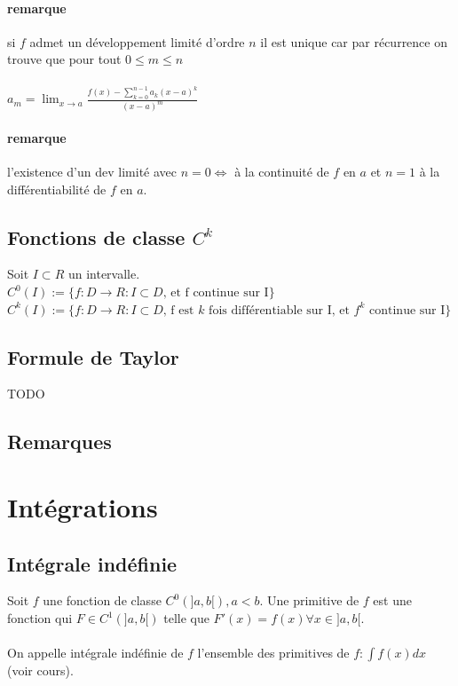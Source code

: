 \documentclass{article}
\begin{document}
\paragraph{remarque} si $ f $ admet un développement limité d'ordre $ n $ il est unique car par récurrence on trouve que pour tout $ 0 \leq m \leq n $\\\\
$a_m = \lim_{x\to{a}} \frac{f(x) - \sum_{k=0}^{n-1} a_k(x-a)^k}{(x-a)^m}$

\paragraph{remarque} l'existence d'un dev limité avec $ n = 0 \Leftrightarrow $ à la continuité de $ f $ en $ a $ et $ n = 1 $ à la différentiabilité de $ f $ en $ a $. 

\subsection{Fonctions de classe $C^k$}

Soit $ I \subset R $ un intervalle.\\
$C^0(I) := \{ f : D \to R : I \subset D \text{, et f continue sur I} \}$\\
$C^k(I) := \{ f : D \to R : I \subset D \text{, f est $k$ fois différentiable sur I, et $f^k$ continue sur I} \}$

\subsection{Formule de Taylor}

TODO

\subsection{Remarques}

\section{Intégrations}

\subsection{Intégrale indéfinie}

Soit $ f $ une fonction de classe $ C^0(]a, b[), a < b $. Une primitive de $ f  $ est une fonction qui $ F \in C^1(]a, b[) $ telle que $ F'(x) = f(x) \forall x \in ]a, b[ $. \\\\
On appelle intégrale indéfinie de $ f $ l'ensemble des primitives de $ f : \int f(x)dx $ (voir cours).
\end{document}
